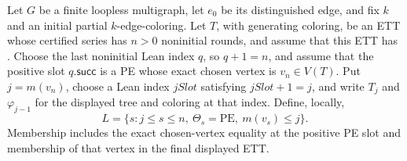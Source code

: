 \begin{lemma}
Let \(G\) be a finite loopless multigraph, let \(e_0\) be its
distinguished edge, and fix \(k\) and an initial partial \(k\)-edge-coloring.
Let \(T\), with generating coloring, be an ETT whose certified series has
\(n>0\) noninitial rounds, and assume that this ETT has
.  Choose the last noninitial Lean index \(q\),
so \(q+1=n\), and assume that the positive slot \(q.\mathsf{succ}\) is a
PE whose exact chosen vertex is \(v_n\in V(T)\).  Put \(j=m(v_n)\), choose
a Lean index \(jSlot\) satisfying \(jSlot+1=j\), and write \(T_j\) and
\(\varphi_{j-1}\) for the displayed tree and coloring at that index.
Define, locally,
\[
 L=\{s:j\leq s\leq n,\ \Theta_s=\mathrm{PE},\
                         m(v_s)\leq j\}.                       \tag{A}
\]
Membership includes the exact chosen-vertex equality at the positive PE
slot and membership of that vertex in the final displayed ETT.


\end{lemma}
